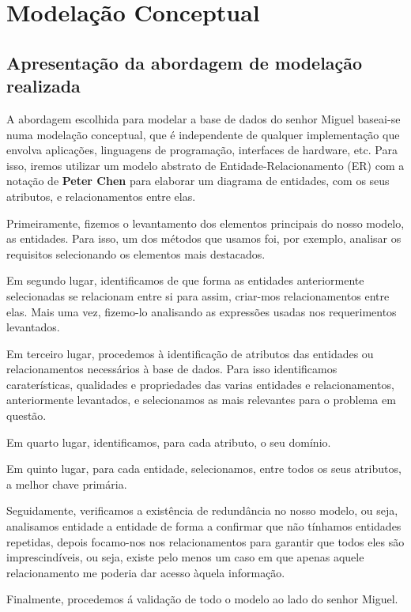 \chapter{Modelação Conceptual}



\section{Apresentação da abordagem de modelação realizada}

A abordagem escolhida para modelar a base de dados do senhor Miguel baseai-se numa modelação conceptual, que é independente de qualquer implementação que envolva aplicações, linguagens de programação, interfaces de hardware, etc. Para isso, iremos utilizar um modelo abstrato de Entidade-Relacionamento (ER) com a notação de \textbf{Peter Chen} para elaborar um diagrama de entidades, com os seus atributos, e relacionamentos entre elas.\par
Primeiramente, fizemos o levantamento dos elementos principais do nosso modelo, as entidades. Para isso, um dos métodos que usamos foi, por exemplo, analisar os requisitos selecionando os elementos mais destacados.\par
Em segundo lugar, identificamos de que forma as entidades anteriormente selecionadas se relacionam entre si para assim, criar-mos relacionamentos entre elas. Mais uma vez, fizemo-lo  analisando as expressões usadas nos requerimentos levantados.\par
Em terceiro lugar, procedemos à identificação de atributos das entidades ou relacionamentos necessários à base de dados. Para isso identificamos caraterísticas, qualidades e propriedades das varias entidades e relacionamentos, anteriormente levantados, e selecionamos as mais relevantes para o problema em questão.\par
Em quarto lugar, identificamos, para cada atributo, o seu domínio.\par
Em quinto lugar, para cada entidade, selecionamos, entre todos os seus atributos, a melhor chave primária.\par
Seguidamente, verificamos a existência de redundância no nosso modelo, ou seja, analisamos entidade a entidade de forma a confirmar que não tínhamos entidades repetidas, depois focamo-nos nos relacionamentos para garantir que todos eles são imprescindíveis, ou seja, existe pelo menos um caso em que apenas aquele relacionamento me poderia dar acesso àquela informação.\par
Finalmente, procedemos á validação de todo o modelo ao lado do senhor Miguel.

